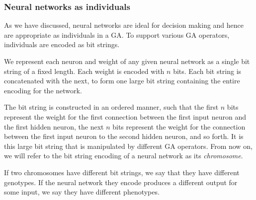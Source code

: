 \subsubsection{Neural networks as individuals}

As we have discussed, neural networks are ideal for decision making and hence are appropriate as individuals in a GA. To support various GA operators, individuals are encoded as bit strings.


We represent each neuron and weight of any given neural network as a single bit string of a fixed length. Each weight is encoded with $n$ bits. Each bit string is concatenated with the next, to form one large bit string containing the entire encoding for the network.

The bit string is constructed in an ordered manner, such that the first $n$ bits represent the weight for the first connection between the first input neuron and the first hidden neuron, the next $n$ bits represent the weight for the connection between the first input neuron to the second hidden neuron, and so forth. It is this large bit string that is manipulated by different GA operators. From now on, we will refer to the bit string encoding of a neural network as its \emph{chromosome}.




%
If two chromosomes have different bit strings, we say that they have different genotypes. If the neural network they encode produces a different output for some input, we say they have different phenotypes.
